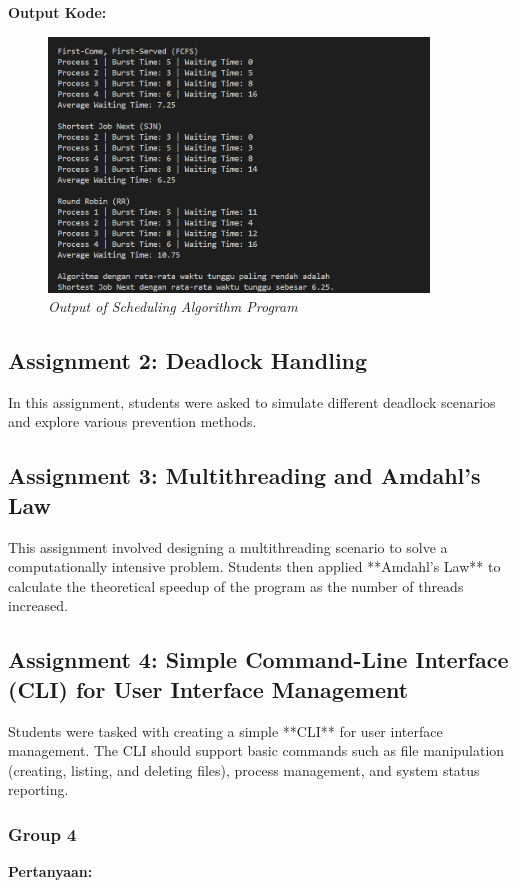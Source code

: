 \documentclass[12pt]{article}
\begin{document}
\noindent \textbf{Output Kode:}
\begin{figure}[h]
    \centering
    \includegraphics[width=0.9\textwidth]{asset/a1-output.png}
    \caption{\textit{Output of Scheduling Algorithm Program}}
    \label{fig:a1-output}
\end{figure}

\subsection{Assignment 2: Deadlock Handling}
In this assignment, students were asked to simulate different deadlock scenarios and explore various prevention methods.

\subsection{Assignment 3: Multithreading and Amdahl's Law}
This assignment involved designing a multithreading scenario to solve a computationally intensive problem. Students then applied **Amdahl's Law** to calculate the theoretical speedup of the program as the number of threads increased.

\subsection{Assignment 4: Simple Command-Line Interface (CLI) for User Interface Management}
Students were tasked with creating a simple **CLI** for user interface management. The CLI should support basic commands such as file manipulation (creating, listing, and deleting files), process management, and system status reporting.
\subsubsection{Group 4}
\noindent \textbf{Pertanyaan: }
\end{document}
